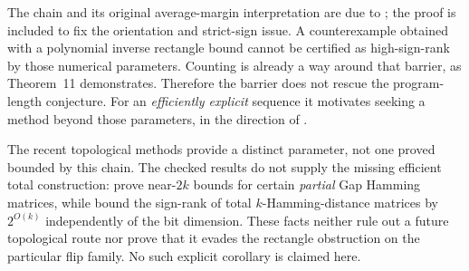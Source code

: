 The chain and its original average-margin interpretation are due to \citet{HHPTZ22}; the proof is included to fix the orientation and strict-sign issue. A counterexample obtained with a polynomial inverse rectangle bound cannot be certified as high-sign-rank by those numerical parameters. Counting is already a way around that barrier, as Theorem~11 demonstrates. Therefore the barrier does not rescue the program-length conjecture. For an \emph{efficiently explicit} sequence it motivates seeking a method beyond those parameters, in the direction of \citet[Problem~4.1]{HHPTZ22}.

The recent topological methods provide a distinct parameter, not one proved bounded by this chain. The checked results do not supply the missing efficient total construction: \citet{FHV26} prove near-$2k$ bounds for certain \emph{partial} Gap Hamming matrices, while \citet{GHIS25} bound the sign-rank of total $k$-Hamming-distance matrices by $2^{O(k)}$ independently of the bit dimension. These facts neither rule out a future topological route nor prove that it evades the rectangle obstruction on the particular flip family. No such explicit corollary is claimed here.
